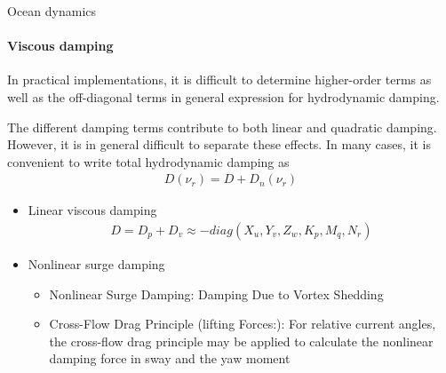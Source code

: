 



\begin{frame}{Ocean dynamics}
	\framesubtitle{Viscous damping}
	In practical implementations, it is difficult to determine higher-order terms as well as the off-diagonal terms in general expression for hydrodynamic damping.
	
	The different damping terms contribute to both linear and quadratic damping. However, it is in general difficult to separate these effects. In many cases, it is convenient to write total hydrodynamic damping as
	\begin{align}
		D(\nu_r) = D + D_n(\nu_r)
	\end{align}
	\begin{itemize}
		\item Linear viscous damping
		\begin{align}
			D = D_p + D_v \approx -diag(X_u, Y_v, Z_w, K_p, M_q, N_r)
		\end{align}
		\item Nonlinear surge damping
		\begin{itemize}
			\item Nonlinear Surge Damping: Damping Due to Vortex Shedding
			\item Cross-Flow Drag Principle (lifting Forces:): For relative current angles, the cross-flow drag principle may be applied to calculate the nonlinear damping force in sway and the yaw moment
		\end{itemize}
	\end{itemize}
\end{frame}










